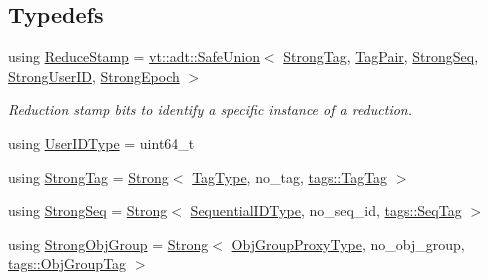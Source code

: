 \subsection*{Typedefs}
\begin{DoxyCompactItemize}
\item 
using \hyperlink{namespacevt_1_1collective_1_1reduce_1_1detail_aacc1fcd729d934ba143fee3a943bf9e7}{Reduce\+Stamp} = \hyperlink{namespacevt_1_1adt_ad2a7bbcb5f4735ae9d847f96ee62f144}{vt\+::adt\+::\+Safe\+Union}$<$ \hyperlink{namespacevt_1_1collective_1_1reduce_1_1detail_a5e1b708dc12ad0d1209a354ed21ed744}{Strong\+Tag}, \hyperlink{structvt_1_1collective_1_1reduce_1_1detail_1_1_tag_pair}{Tag\+Pair}, \hyperlink{namespacevt_1_1collective_1_1reduce_1_1detail_affec2854d7d65bafb17eb259714e9443}{Strong\+Seq}, \hyperlink{namespacevt_1_1collective_1_1reduce_1_1detail_af9e42b20d1be7dccc1b5e587f0387e02}{Strong\+User\+ID}, \hyperlink{namespacevt_1_1collective_1_1reduce_1_1detail_a9e57fa5e7a2557a92ce0739edae200fe}{Strong\+Epoch} $>$
\begin{DoxyCompactList}\small\item\em Reduction stamp bits to identify a specific instance of a reduction. \end{DoxyCompactList}\item 
using \hyperlink{namespacevt_1_1collective_1_1reduce_1_1detail_ae82d7b96b0885b9b7dfb0104398beead}{User\+I\+D\+Type} = uint64\+\_\+t
\item 
using \hyperlink{namespacevt_1_1collective_1_1reduce_1_1detail_a5e1b708dc12ad0d1209a354ed21ed744}{Strong\+Tag} = \hyperlink{structvt_1_1collective_1_1reduce_1_1detail_1_1_strong}{Strong}$<$ \hyperlink{namespacevt_a84ab281dae04a52a4b243d6bf62d0e52}{Tag\+Type}, no\+\_\+tag, \hyperlink{structvt_1_1collective_1_1reduce_1_1detail_1_1tags_1_1_tag_tag}{tags\+::\+Tag\+Tag} $>$
\item 
using \hyperlink{namespacevt_1_1collective_1_1reduce_1_1detail_affec2854d7d65bafb17eb259714e9443}{Strong\+Seq} = \hyperlink{structvt_1_1collective_1_1reduce_1_1detail_1_1_strong}{Strong}$<$ \hyperlink{namespacevt_a3063d4db3b879d6dd2c7b8d50995c7f6}{Sequential\+I\+D\+Type}, no\+\_\+seq\+\_\+id, \hyperlink{structvt_1_1collective_1_1reduce_1_1detail_1_1tags_1_1_seq_tag}{tags\+::\+Seq\+Tag} $>$
\item 
using \hyperlink{namespacevt_1_1collective_1_1reduce_1_1detail_afd4940b3a4ac2ef740f0e3844a09dd08}{Strong\+Obj\+Group} = \hyperlink{structvt_1_1collective_1_1reduce_1_1detail_1_1_strong}{Strong}$<$ \hyperlink{namespacevt_ad7cae989df485fccca57f0792a880a8e}{Obj\+Group\+Proxy\+Type}, no\+\_\+obj\+\_\+group, \hyperlink{structvt_1_1collective_1_1reduce_1_1detail_1_1tags_1_1_obj_group_tag}{tags\+::\+Obj\+Group\+Tag} $>$

\end{DoxyCompactItemize}
